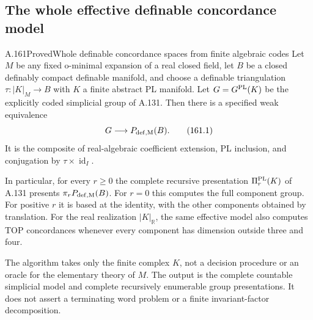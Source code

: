 \subsection{The whole effective definable concordance model}

\begin{saresult}{A.161}{Proved}{Whole definable concordance spaces from finite algebraic codes}
Let \(M\) be any fixed o-minimal expansion of a real closed field,
let \(B\) be a closed definably compact definable manifold, and choose
a definable triangulation \(\tau:|K|_M\to B\) with \(K\) a finite
abstract PL manifold. Let \(G=G^{\rm PL}(K)\) be the explicitly coded
simplicial group of A.131. Then there is a specified weak equivalence
\[
 G\longrightarrow P_{\rm def,M}(B).
 \tag{161.1}
\]
It is the composite of real-algebraic coefficient extension, PL
inclusion, and conjugation by \(\tau\times\operatorname{id}_I\).

In particular, for every \(r\geq0\) the complete recursive presentation
\(\Pi_r^{\rm PL}(K)\) of A.131 presents
\(\pi_rP_{\rm def,M}(B)\). For \(r=0\) this computes the full component
group. For positive \(r\) it is based at the identity, with the other
components obtained by translation. For the real realization
\(|K|_{\mathbb R}\), the same effective model also computes TOP
concordances whenever every component has dimension outside three
and four.

The algorithm takes only the finite complex \(K\), not a decision
procedure or an oracle for the elementary theory of \(M\).
The output is the complete countable simplicial model and complete
recursively enumerable group presentations. It does not assert a
terminating word problem or a finite invariant-factor decomposition.
\end{saresult}

